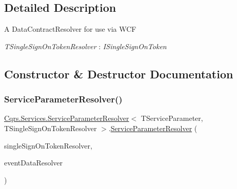 \subsection{Detailed Description}
A Data\+Contract\+Resolver for use via W\+CF 

\begin{Desc}
\item[Type Constraints]\begin{description}
\item[{\em T\+Single\+Sign\+On\+Token\+Resolver} : {\em I\+Single\+Sign\+On\+Token}]\end{description}
\end{Desc}


\subsection{Constructor \& Destructor Documentation}
\mbox{\label{classCqrs_1_1Services_1_1ServiceParameterResolver_a635623bf86cf7b365a1b748dcc02daa8_a635623bf86cf7b365a1b748dcc02daa8}} 
\subsubsection{\texorpdfstring{Service\+Parameter\+Resolver()}{ServiceParameterResolver()}}
{\footnotesize\ttfamily \hyperlink{classCqrs_1_1Services_1_1ServiceParameterResolver}{Cqrs.\+Services.\+Service\+Parameter\+Resolver}$<$ T\+Service\+Parameter, T\+Single\+Sign\+On\+Token\+Resolver $>$.\hyperlink{classCqrs_1_1Services_1_1ServiceParameterResolver}{Service\+Parameter\+Resolver} (\begin{DoxyParamCaption}\item[{\hyperlink{interfaceCqrs_1_1Services_1_1ISingleSignOnTokenResolver}{I\+Single\+Sign\+On\+Token\+Resolver}}]{single\+Sign\+On\+Token\+Resolver,  }\item[{\hyperlink{interfaceCqrs_1_1Services_1_1IEventDataResolver}{I\+Event\+Data\+Resolver}}]{event\+Data\+Resolver }\end{DoxyParamCaption})\hspace{0.3cm}{\ttfamily [protected]}}



